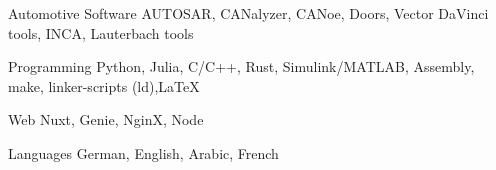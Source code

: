 


\begin{cvskills}


\cvskill
{Automotive Software} %
{AUTOSAR, CANalyzer, CANoe, Doors, Vector DaVinci tools, INCA, Lauterbach tools} %


\cvskill
{Programming} %
{Python, Julia, C/C++, Rust, Simulink/MATLAB, Assembly, make, linker-scripts (ld),LaTeX} %


\cvskill
{Web} %
{Nuxt, Genie, NginX, Node} %


\cvskill
{Languages} %
{German, English, Arabic, French} %


\end{cvskills}
